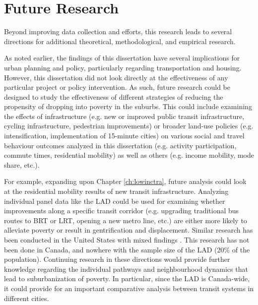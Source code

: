 \section{Future Research}

Beyond improving data collection and efforts, this research leads to several directions for additional theoretical, methodological, and empirical research. 

As noted earlier, the findings of this dissertation have several implications for urban planning and policy, particularly regarding transportation and housing. However, this dissertation did not look directly at the effectiveness of any particular project or policy intervention. As such, future research could be designed to study the effectiveness of different strategies of reducing the propensity of dropping into poverty in the suburbs. This could include examining the effects of infrastructure (e.g. new or improved public transit infrastructure, cycling infrastructure, pedestrian improvements) or broader land-use policies (e.g. intensification, implementation of 15-minute cities) on various social and travel behaviour outcomes analyzed in this dissertation (e.g. activity participation, commute times, residential mobility) as well as others (e.g. income mobility, mode share, etc.).

For example, expanding upon Chapter \ref{ch:lowinctra}, future analysis could look at the residential mobility results of new transit infrastructure. Analyzing individual panel data like the LAD could be used for examining whether improvements along a specific transit corridor (e.g. upgrading traditional bus routes to BRT or LRT, opening a new metro line, etc.) are either more likely to alleviate poverty or result in gentrification and displacement. Similar research has been conducted in the United States with mixed findings \cite{delmelle_new_2020, delmelle_transit-induced_2021}. This research has not been done in Canada, and nowhere with the sample size of the LAD (20\% of the population). Continuing research in these directions would provide further knowledge regarding the individual pathways and neighbourhood dynamics that lead to suburbanization of poverty. In particular, since the LAD is Canada-wide, it could provide for an important comparative analysis between transit systems in different cities.

